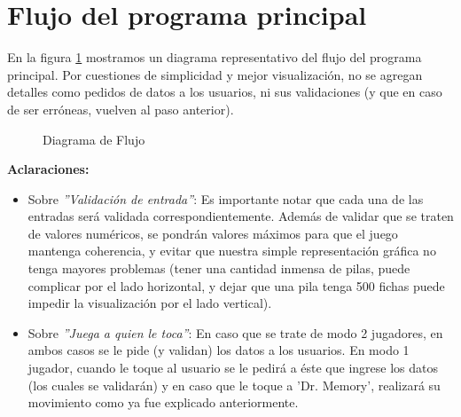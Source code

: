 \documentclass[a4paper,12pt]{article}
\begin{document}
\section{Flujo del programa principal}
En la figura \ref{D.Flujo} mostramos un diagrama representativo del flujo del programa principal. Por cuestiones de simplicidad y mejor visualización, no se agregan detalles como pedidos de datos a los usuarios, ni sus validaciones (y que en caso de ser erróneas, vuelven al paso anterior).\\

\begin{figure}
	\centering

	

	\caption{Diagrama de Flujo}
	\label{D.Flujo}
\end{figure}

\textbf{Aclaraciones:}
\begin{itemize}
\item Sobre \textit{''Validación de entrada''}: Es importante notar que cada una de las entradas será validada correspondientemente. Además de validar que se traten de valores numéricos, se pondrán valores máximos para que el juego mantenga coherencia, y evitar que nuestra simple representación gráfica no tenga mayores problemas (tener una cantidad inmensa de pilas, puede complicar por el lado horizontal, y dejar que una pila tenga 500 fichas puede impedir la visualización por el lado vertical). 
\item Sobre \textit{''Juega a quien le toca''}: En caso que se trate de modo 2 jugadores, en ambos casos se le pide (y validan) los datos a los usuarios. En modo 1 jugador, cuando le toque al usuario se le pedirá a éste que ingrese los datos (los cuales se validarán) y en caso que le toque a 'Dr. Memory', realizará su movimiento como ya fue explicado anteriormente.
\end{itemize}
\end{document}
